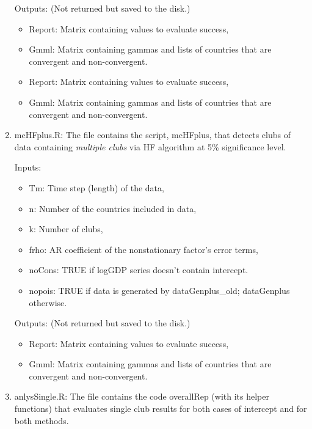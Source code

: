 \documentclass{article}
\begin{document}
\begin{enumerate}
		Outputs: (Not returned but saved to the disk.)
		
		\begin{itemize}
			\item Report: Matrix containing values to evaluate success,
			\item Gmml: Matrix containing gammas and lists of countries that are convergent and non-convergent.
		\end{itemize}		 	
	\begin{itemize}
		\item Report: Matrix containing values to evaluate success,
		\item Gmml: Matrix containing gammas and lists of countries that are convergent and non-convergent.
	\end{itemize}		 	
	
	\item mcHFplus.R: The file contains the script, mcHFplus, that detects clubs of data containing \textit{multiple clubs} via HF algorithm at 5\% significance level.
	
	Inputs:
	\begin{itemize}
		
		\item Tm: Time step (length) of the data,
		\item n: Number of the countries included in data,
		\item k: Number of clubs, 
		\item frho: AR coefficient of the nonstationary factor's error terms,
		\item noCons: TRUE if logGDP series doesn't contain intercept.
		\item nopois: TRUE if data is generated by dataGenplus\_old; dataGenplus otherwise.
	\end{itemize}
	
	Outputs: (Not returned but saved to the disk.)
	
	\begin{itemize}
		\item Report: Matrix containing values to evaluate success,
		\item Gmml: Matrix containing gammas and lists of countries that are convergent and non-convergent.
	\end{itemize}		 	
	
	\item anlysSingle.R: The file contains the code overallRep (with its helper functions) that evaluates single club results for both cases of intercept and for both methods.
	

\end{enumerate}
\end{document}
